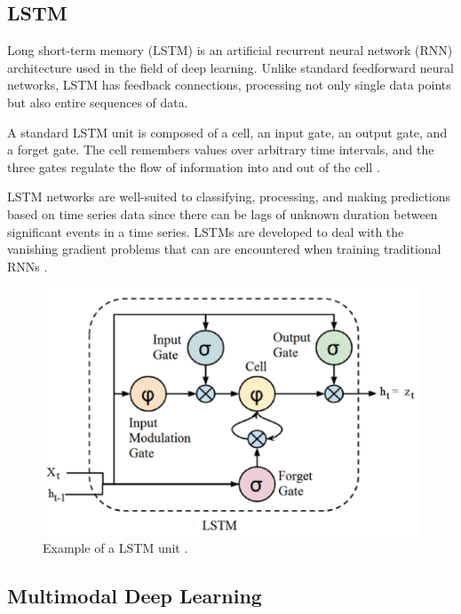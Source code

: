 \documentclass{turabian-thesis}[12pt]
\begin{document}
\subsection{LSTM}

Long short-term memory (LSTM) is an artificial recurrent neural network (RNN) architecture used in the field of deep learning. Unlike standard feedforward neural networks, LSTM has feedback connections, processing not only single data points but also entire sequences of data. 

A standard LSTM unit is composed of a cell, an input gate, an output gate, and a forget gate. The cell remembers values over arbitrary time intervals, and the three gates regulate the flow of information into and out of the cell \cite{donahue_long-term_2016}.

LSTM networks are well-suited to classifying, processing, and making predictions based on time series data since there can be lags of unknown duration between significant events in a time series. LSTMs are developed to deal with the vanishing gradient problems that can are encountered when training traditional RNNs \cite{donahue_long-term_2016}. 

\begin{figure}[h!]
   \begin{center}
      \includegraphics[scale=0.5]{../media/lstm_highlight.png}
   \end{center}
   \caption{Example of a LSTM unit \cite{donahue_long-term_2016}.}
   \label{fig:reinforcementAgent}
\end{figure}

\subsection{Multimodal Deep Learning}
\end{document}
